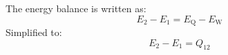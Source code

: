The energy balance is written as:  
\[
E_2 - E_1 = E_{\text{Q}} - E_{\text{W}}
\]  
Simplified to:  
\[
E_2 - E_1 = Q_{12}
\]